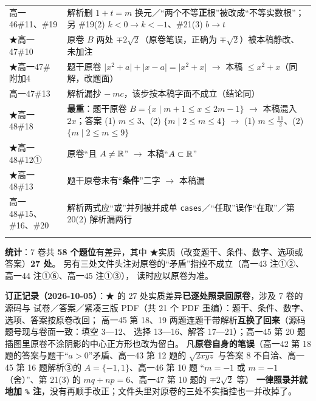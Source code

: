 \documentclass[a4paper,11pt]{article}
\begin{document}
\begin{xltabular}{\textwidth}{@{}>{\raggedright\arraybackslash}p{6.88cm}>{\raggedright\arraybackslash}p{8.28cm}@{}}
高一46\#11、\#19 & 解析删 \(1+t=m\) 换元／``两个不等\textbf{正}根''被改成``不等实数根''；另 \#19(2) \(k<0\to\allowbreak  k<-1\)、\#21(3) \(b\to\allowbreak  t\) \\ \addlinespace[1pt]
★高一47\#10 & 原卷 \(B\) 两处 \(\mp2\sqrt2\)（原卷笔误，正确为 \(\mp\sqrt2\)）被本稿静改、未加注 \\ \addlinespace[1pt]
★高一47\#附加4 & 题干原卷 \(\lvert x^2+a\rvert+\allowbreak \lvert x-a\rvert=\allowbreak \lvert x^2+x\rvert\) $\to$ 本稿 \(\leqslant\allowbreak  x^2+x\)（同解，改题面） \\ \addlinespace[1pt]
高一47\#13 & 解析漏抄 \(-\ mc\)，该步按本稿字面不成立（结论同） \\ \addlinespace[1pt]
★高一48\#18 & \textbf{最重}：题干原卷 \(B=\allowbreak \{x\mid\allowbreak  m+\allowbreak 1\leqslant\allowbreak  x\leqslant\allowbreak 2m-1\}\) $\to$ 本稿混入 \(2x\)；答案 (1) \(m\leqslant\allowbreak 3\)、(2) \(\{m\mid\allowbreak 2\leqslant\allowbreak  m\leqslant\allowbreak 4\}\) $\to$ (1) \(m\leqslant\allowbreak \frac{11}2\)、(2) \(\{m\mid\allowbreak 2\leqslant\allowbreak  m\leqslant\allowbreak 9\}\) \\ \addlinespace[1pt]
★高一48\#12① & 原卷``且 \(A\neq\mathbb{R}\)'' $\to$ 本稿``\(A\subset\allowbreak \mathbb{R}\)'' \\ \addlinespace[1pt]
★高一48\#13 & 题干原卷末有``\textbf{条件}''二字 $\to$ 本稿漏 \\ \addlinespace[1pt]
高一48\#15、\#16、\#20 & 解析两式应``或''并列被并成单 \texttt{cases}／``任取''误作``在取''／第 20(2) 解析漏两行 \\ \addlinespace[1pt]
\end{xltabular}

\textbf{统计}：7 卷共 \textbf{58 个题位}有差异，其中 ★实质（改变题干、条件、数字、选项或答案）\textbf{27 处}。
另有三处文件头注对原卷的``矛盾''指控不成立（高一43 注①②、高一44 注①⑥、高一45 注①③），
读时应以原卷为准。

\textbf{订正记录（2026-10-05）}：★ 的 27 处实质差异\textbf{已逐处照录回原卷}，涉及 7 卷的源码与
试卷／答案／紧凑三版 PDF（共 21 个 PDF 重编）：题干、条件、数字、选项、答案按原卷改回；
高一45 第 18、19 两题连题干带解析\textbf{互换了回来}（源码题号现与卷面一致：填空 3---12、
选择 13---16、解答 17---21）；高一45 第 20 题插图里原卷不涂阴影的中心正方形也改为留白。
凡\textbf{原卷自身的笔误}（高一42 第 18 题的答案与题干``\(a>0\)''矛盾、高一43 第 12 题的
\(\sqrt{2xyz}\) 与答案 8 不自洽、高一45 第 16 题解析③的 \(A=\{-1,1\}\)、高一46 第 10 题
``\(m=-1\) 或 \(m=-1\)（舍）''、第 21(3) 的 \(mq+np=6\)、高一47 第 10 题的 \(\mp2\sqrt2\) 等）
\textbf{一律照录并就地加 \texttt{\%} 注}，没有再顺手改正；文件头里对原卷的三处不实指控也一并改掉了。
\end{document}
